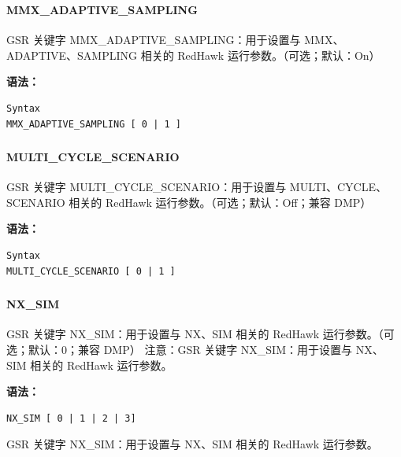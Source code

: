 \subsubsection{}
\paragraph*{MMX_ADAPTIVE_SAMPLING}

GSR 关键字 MMX_ADAPTIVE_SAMPLING：用于设置与 MMX、ADAPTIVE、SAMPLING 相关的 RedHawk 运行参数。（可选；默认：On）

\textbf{语法：}
\begin{lstlisting}
Syntax
MMX_ADAPTIVE_SAMPLING [ 0 | 1 ]
\end{lstlisting}

\subsubsection{}
\paragraph*{MULTI_CYCLE_SCENARIO}

GSR 关键字 MULTI_CYCLE_SCENARIO：用于设置与 MULTI、CYCLE、SCENARIO 相关的 RedHawk 运行参数。（可选；默认：Off；兼容 DMP）

\textbf{语法：}
\begin{lstlisting}
Syntax
MULTI_CYCLE_SCENARIO [ 0 | 1 ]
\end{lstlisting}

\subsubsection{}
\paragraph*{NX_SIM}

GSR 关键字 NX_SIM：用于设置与 NX、SIM 相关的 RedHawk 运行参数。（可选；默认：0；兼容 DMP） 注意：GSR 关键字 NX_SIM：用于设置与 NX、SIM 相关的 RedHawk 运行参数。

\textbf{语法：}
\begin{lstlisting}
NX_SIM [ 0 | 1 | 2 | 3]
\end{lstlisting}

\begin{noteBox}
GSR 关键字 NX\_SIM：用于设置与 NX、SIM 相关的 RedHawk 运行参数。
\end{noteBox}


